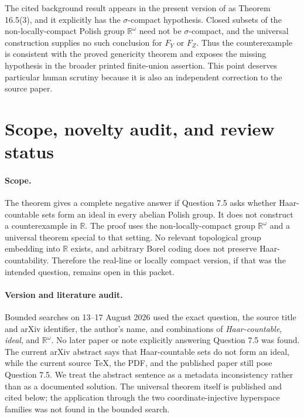 \documentclass[11pt]{article}
\newcommand{\R}{\mathbb R}
\begin{document}
The cited background result appears in the present version of
\cite{banakh-et-al} as Theorem 16.5(3), and it explicitly has the
$\sigma$-compact hypothesis.  Closed subsets of the non-locally-compact
Polish group $\R^\omega$ need not be $\sigma$-compact, and the universal
construction supplies no such conclusion for $F_Y$ or $F_Z$.  Thus the
counterexample is consistent with the proved genericity theorem and exposes
the missing hypothesis in the broader printed finite-union assertion.  This
point deserves particular human scrutiny because it is also an independent
correction to the source paper.

\section{Scope, novelty audit, and review status}
\label{sec:scope}

\paragraph{Scope.}
The theorem gives a complete negative answer if Question 7.5 asks whether
Haar-countable sets form an ideal in every abelian Polish group.  It does not
construct a counterexample in $\R$.  The proof uses the non-locally-compact
group $\R^\omega$ and a universal theorem special to that setting.  No
relevant topological group embedding into $\R$ exists, and arbitrary Borel
coding does not preserve Haar-countability.  Therefore the real-line or
locally compact version, if that was the intended question, remains open in
this packet.

\paragraph{Version and literature audit.}
Bounded searches on 13--17 August 2026 used the exact question, the source
title and arXiv identifier, the author's name, and combinations of
\emph{Haar-countable}, \emph{ideal}, and $\R^\omega$.  No later paper or note
explicitly answering Question 7.5 was found.  The current arXiv abstract says
that Haar-countable sets do not form an ideal, while the current source TeX,
the PDF, and the published paper still pose Question 7.5.  We treat the
abstract sentence as a metadata inconsistency rather than as a documented
solution.  The universal theorem itself is published and cited below; the
application through the two coordinate-injective hyperspace families was not
found in the bounded search.
\end{document}
